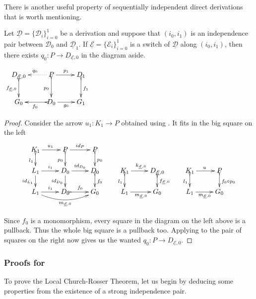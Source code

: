 \documentclass[a4paper,UKenglish,cleveref,pdftex,thm-restate,numberwithinsect]{lipics-v2021}
\newcommand{\id}[1]{\mathsf{id}_{#1}}
\newcommand{\dder}[1]{\mathscr{#1}}
\newcommand{\der}[1]{\underline{\dder{#1}}}
\begin{document}
There is another
useful property of  sequentially independent direct
derivations that is worth mentioning.

\noindent
\parbox{9.5cm}
{\begin{proposition}\label{lem:cose}Let
    $\der{D}=\{\dder{D}_i\}_{i=0}^1$ be a derivation and suppose
    that $(i_0, i_1)$ is an independence pair between $\dder{D}_0$
    and $\der{D}_1$.  If $\der{E}=\{\dder{E}_i\}_{i=0}^1$ is a
    switch of $\der{D}$ along $(i_0, i_1)$, then there exists
    $q_0\colon P\to D_{\der{E},0}$ in the diagram
    aside. \end{proposition}}
\parbox{4cm}{$\xymatrix{D_{\der{E},0} \ar@{>->}[d]_{f_{\der{E},0}}&P
    \ar@{.>}[l]_{q_0} \ar[r]^{p_1} \ar@{>->}[d]_{p_0}& D_1
    \ar@{>->}[d]^{f_1}\\ G_{0}&D_0 \ar@{>->}[l]^{f_0}\ar[r]_{g_0}&
    G_1}$}

\begin{proof}
  Consider the arrow $u_1\colon K_1\to P$ obtained using
  . It fits in the big square on the left
\[		\xymatrix@R=15pt{K_1 \ar[r]^{u_1} \ar@{>->}[d]_{l_1}&P
	\ar[r]^{\id{P}}\ar@{>->}[d]_{p_0}& P\ar@{>->}[d]^{p_0}\\L_1
	\ar[d]_{\id{L_1}}\ar[r]^{i_1}&D_0 \ar[r]^{\id{D_0}}
	\ar[d]_{\id{D_0}}& D_{0} \ar@{>->}[d]^{f_0}&K_1 \ar@{>->}[d]_{l_1}\ar[r]^{k_{\der{E},0}}&
	D_{\der{E},0} \ar@{>->}[d]^{f_{\der{E},0}} & K_1 \ar[r]^{u}
	\ar@{>->}[d]_{l_1}& P \ar@{>->}[d]^{f_0\circ
		p_0}\\
	L_1\ar[r]^{i_1} \ar@/_.4cm/[rr]_{m_{\der{E},0}}&D_0
	\ar@{>->}[r]^{f_0}&G_0 & L_1\ar[r]_{m_{\der{E},0}}&G_0 &L_1
	\ar[r]_{m_{\der{E},0}}&G_0}\]

  	Since $f_0$ is a monomorphism, every square in the diagram on the left above
  	is a pullback. Thus the whole big square is a pullback too.
  	Applying  to the pair of squares on the right now gives
  	us the wanted $q_0\colon P\to D_{\der{E},0}$.
\end{proof}


\subsubsection{Proofs for }

To prove the Local Church-Rosser Theorem, let us begin by deducing some properties from the existence of a strong independence pair. 
\end{document}
